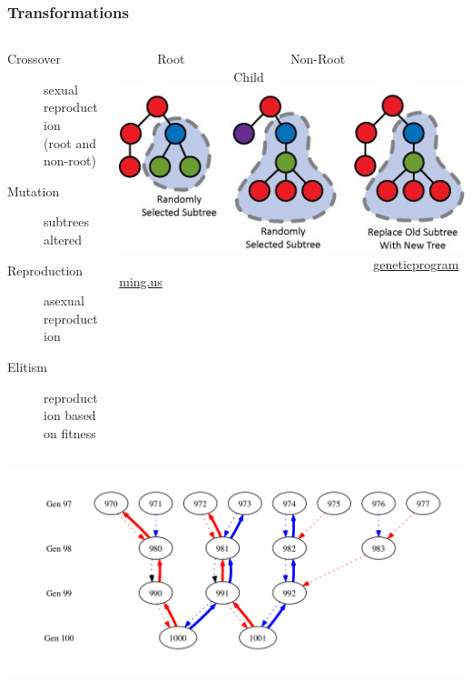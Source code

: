 \documentclass{beamer}
\begin{document}
\begin{frame}
\frametitle{Transformations}
\begin{columns}
\begin{column}{0.55\textwidth}
{\footnotesize
		\begin{description}
		\item[Crossover] sexual reproduction \\ (root and non-root)
		\item[Mutation] subtrees altered
		\item[Reproduction] asexual reproduction
		\item[Elitism] reproduction based on fitness
		\end{description}
}
\end{column}
\begin{column}{0.45\textwidth}
{\tiny \ \ \ \ \ \ Root \ \ \ \ \ \ \ \ \ \ \ \ \ \ \ \ Non-Root \ \ \ \ \ \ \ \ \ \ \ \ \ \ \ \ \ \ Child}
\includegraphics[width=.95\textwidth]{subtreeCrossover.jpg} \\
{\tiny \ \ \ \ \ \ \ \ \ \ \ \ \ \ \ \ \ \ \ \ \ \ \ \ \ \ \ \ \ \ \ \ \ \ \ \ \ \ \ \ \url{geneticprogramming.us}}
\end{column}
\end{columns}
\vspace*{-0.5cm}
\begin{center}
\includegraphics[width=.9\textwidth]{XO_path_example.pdf}
\end{center}
\end{frame}
\end{document}
